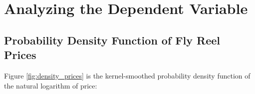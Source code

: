 %
%
%
%
%
%
%
%
%
%




\section{Analyzing the Dependent Variable}

\subsection{Probability Density Function of Fly Reel Prices}

Figure \ref{fig:density_prices} is the kernel-smoothed probability density function of the natural logarithm of
price:


